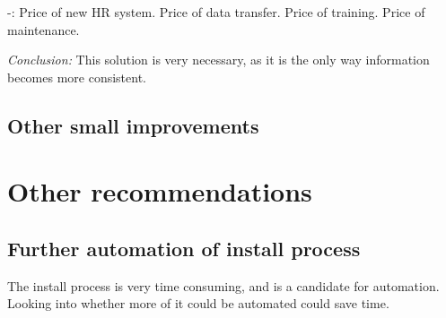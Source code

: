 -: Price of new HR system.
Price of data transfer.
Price of training.
Price of maintenance.

\emph{Conclusion:} This solution is very necessary, as it is the only way information becomes more consistent.

\subsection{Other small improvements}

\section{Other recommendations}
\subsection{Further automation of install process}
The install process is very time consuming, and is a candidate for automation.
Looking into whether more of it could be automated could save time.
